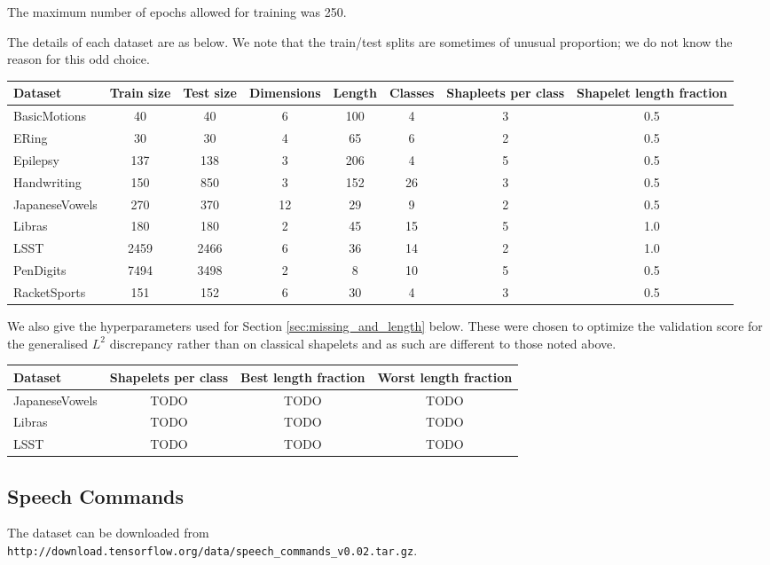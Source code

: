 \documentclass{article}
\theoremstyle{plain}
\theoremstyle{definition}
\begin{document}
	The maximum number of epochs allowed for training was 250.
	
	The details of each dataset are as below. We note that the train/test splits are sometimes of unusual proportion; we do not know the reason for this odd choice.

	\begin{tabular}{lccccccc}
		\toprule
		Dataset & Train size & Test size & Dimensions & Length & Classes & \parbox{10mm}{Shapleets per class} & \parbox{10mm}{Shapelet length fraction} \\ \midrule
		BasicMotions    & 40 & 40 & 6 & 100 & 4 & 3 & 0.5 \\
		ERing           & 30 & 30 & 4 & 65 & 6 & 2 & 0.5 \\
		Epilepsy        & 137 & 138 & 3 & 206 & 4 & 5 & 0.5 \\
		Handwriting     & 150 & 850 & 3 & 152 & 26 & 3 & 0.5 \\
		JapaneseVowels  & 270 & 370 & 12 & 29 & 9 & 2 & 0.5 \\
		Libras          & 180 & 180 & 2 & 45 & 15 & 5 & 1.0 \\
		LSST            & 2459 & 2466 & 6 & 36 & 14 & 2 & 1.0 \\
		PenDigits       & 7494 & 3498 & 2 & 8 & 10 & 5 & 0.5 \\
		RacketSports    & 151 & 152 & 6 & 30 & 4 & 3 & 0.5 \\
		\bottomrule
	\end{tabular}

	We also give the hyperparameters used for Section \ref{sec:missing_and_length} below. These were chosen to optimize the validation score for the generalised $L^2$ discrepancy rather than on classical shapelets and as such are different to those noted above.

	\begin{tabular}{lccc}
		\toprule
		Dataset & \parbox{10mm}{Shapelets per class} & Best length fraction & Worst length fraction \\ \midrule
		JapaneseVowels  & TODO & TODO & TODO \\
		Libras          & TODO & TODO & TODO \\
		LSST            & TODO & TODO & TODO \\
		\bottomrule
	\end{tabular}

	\subsection{Speech Commands}
	The dataset can be downloaded from\\ \texttt{http://download.tensorflow.org/data/speech\_commands\_v0.02.tar.gz}.
	
\end{document}
